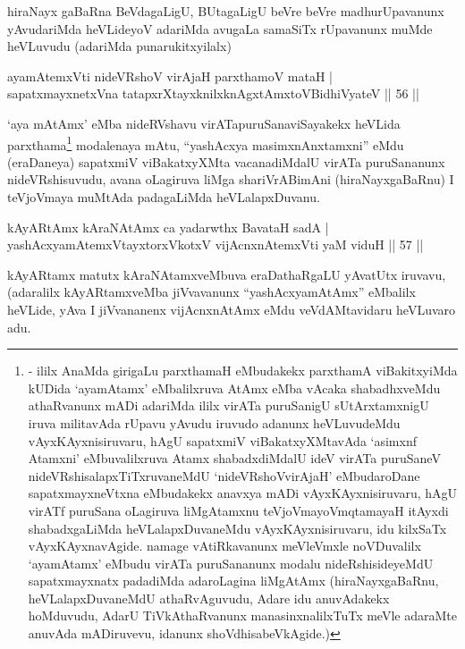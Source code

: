 \begin{artha}
hiraNayx gaBaRna BeVdagaLigU, BUtagaLigU beVre beVre madhurUpavanunx
yAvudariMda heVLideyoV adariMda avugaLa samaSiTx rUpavanunx muMde
heVLuvudu (adariMda punarukitxyilalx) 
\end{artha}

\begin{shl}
ayamAtemxVti nideVRshoV virAjaH parxthamoV mataH |\\
sapatxmayxnetxVna tatapxrXtayxknilxknAgxtAmx\s toV\s BidhiVyateV \hfill || 56 ||
\end{shl}

\begin{artha}
`aya mAtAmx' eMba nideRVshavu virATapuruSanaviSayakekx heVLida parxthama\footnote{- ililx AnaMda girigaLu parxthamaH eMbudakekx     parxthamA viBakitxyiMda kUDida `ayamAtamx' eMbalilxruva AtAmx eMba     vAcaka shabadhxveMdu athaRvanunx mADi adariMda ililx virATa     puruSanigU sUtArxtamxnigU iruva militavAda rUpavu yAvudu iruvudo     adanunx heVLuvudeMdu vAyxKAyxnisiruvaru, hAgU sapatxmiV viBakatxyXMtavAda `asimxnf Atamxni' eMbuvalilxruva Atamx shabadxdiMdalU ideV virATa puruSaneV nideVRshisalapxTiTxruvaneMdU `nideVRshoVvirAjaH'     eMbudaroDane sapatxmayxneVtxna eMbudakekx anavxya mADi     vAyxKAyxnisiruvaru, hAgU virATf puruSana oLagiruva liMgAtamxnu teVjoVmayoV\s mqtamayaH itAyxdi shabadxgaLiMda heVLalapxDuvaneMdu vAyxKAyxnisiruvaru, idu kilxSaTx vAyxKAyxnavAgide. namage vAtiRkavanunx meVleVmxle noVDuvalilx `ayamAtamx' eMbudu virATa puruSananunx modalu nideRshisideyeMdU sapatxmayxnatx padadiMda adaroLagina liMgAtAmx (hiraNayxgaBaRnu, heVLalapxDuvaneMdU athaRvAguvudu, Adare idu anuvAdakekx hoMduvudu, AdarU TiVkAthaRvanunx manasinxnalilxTuTx meVle adaraMte anuvAda mADiruvevu, idanunx shoVdhisabeVkAgide.)} modalenaya mAtu, ``yashAcxya   masimxnAnxtamxni'' eMdu (eraDaneya) sapatxmiV viBakatxyXMta   vacanadiMdalU virATa puruSananunx nideVRshisuvudu, avana oLagiruva   liMga shariVrABimAni (hiraNayxgaBaRnu) I teVjoVmaya muMtAda   padagaLiMda heVLalapxDuvanu.
\end{artha}

\begin{shl}
kAyARtAmx kAraNAtAmx ca yadarwthx BavataH sadA |\\
yashAcxyamAtemxVtayxtorxVkotxV vijAcnxnAtemxVti yaM viduH \hfill || 57 ||
\end{shl}

\begin{artha}
kAyARtamx matutx kAraNAtamxveMbuva eraDathaRgaLU yAvatUtx iruvavu, (adaralilx kAyARtamxveMba jiVvavanunx ``yashAcxyamAtAmx'' eMbalilx heVLide, yAva I jiVvananenx vijAcnxnAtAmx eMdu veVdAMtavidaru heVLuvaro adu.
\end{artha}

